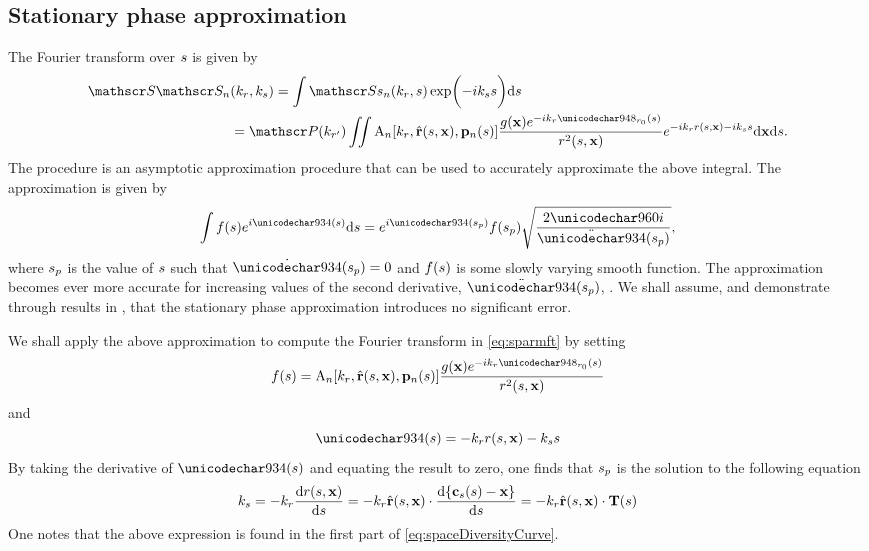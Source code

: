 \subsection{Stationary phase approximation}
The Fourier transform over $s$ is given by
\begin{equation}
\begin{split}
 \SkSk{\channelIndex}&(\kr,\kparm)=\int\Skst{\channelIndex}(\kr,\parm)\Ex{-\im\kparm\parm}\d\parm\\
 &=\Snvelope(\krc)\iint \pattern{\channelIndex}[\kr,\uRangeVector{\parm, \targetnoparm}, \pAntennaParm{\channelIndex}]\frac{\reflectivity(\targetnoparm)\eex{-\im\kr\rangeErrorZero(\parm)}}{\amplitude\range^2(\parm, \targetnoparm)}\eex{-\im\kr\amplitude\range(\parm, \targetnoparm) - \im\kparm\parm}\d\targetnoparm\d\parm.
 \end{split}
 \label{eq:sparmft}
\end{equation}
The  procedure is an asymptotic approximation procedure that can be used to accurately approximate the above integral. The approximation is given by
\begin{equation}
 \int f(\parm)\eex{\im\Phi(\parm)}\d \parm = \eex{\im\Phi(\stationaryparm)}f(\stationaryparm)\sqrt{\frac{2\pi\im}{\ddot\Phi(\stationaryparm)}},
 \label{eq:stationaryphasedefinition}
\end{equation}
where $s_p$ is the value of $s$ such that $\dot{\Phi}(\stationaryparm)=0$ and $f(s)$ is some slowly varying smooth function.
The approximation becomes ever more accurate for increasing values of the second derivative, $\ddot\Phi(\stationaryparm)$, \cite{Spiegel1964}. We shall assume, and demonstrate through results in , that the stationary phase approximation introduces no significant error.
\par
We shall apply the above approximation to compute the Fourier transform in \eqref{eq:sparmft} by setting
\begin{equation}
 f(\parm) = \pattern{\channelIndex}[\kr, \uRangeVectorParm, \pAntennaParm{\channelIndex}]\frac{\reflectivity(\vct\target)\eex{-\im\kr\rangeErrorZero(\parm)}}{\amplitude\range^2(\parm, \targetnoparm)}
\end{equation}
and
\begin{equation}
 \Phi(\parm) = -\kr\amplitude\range(\parm, \targetnoparm) - \kparm\parm
 \label{eq:generalphase}
\end{equation}
By taking the derivative of $\Phi(\parm)$ and equating the result to zero, one finds that $s_p$ is the solution to the following equation
\begin{equation}
 \kparm = -\kr\frac{\d\amplitude\range(\parm, \targetnoparm)}{\d\parm} = -\kr\uRangeVectorParm\cdot\frac{\d\{\sats(\parm) - \target\}}{\d\parm} = -\kr\uRangeVectorParm\cdot\vct{T}(\parm)
 \label{eq:kparmangle}
\end{equation}
One notes that the above expression is found in the first part of \eqref{eq:spaceDiversityCurve}.
